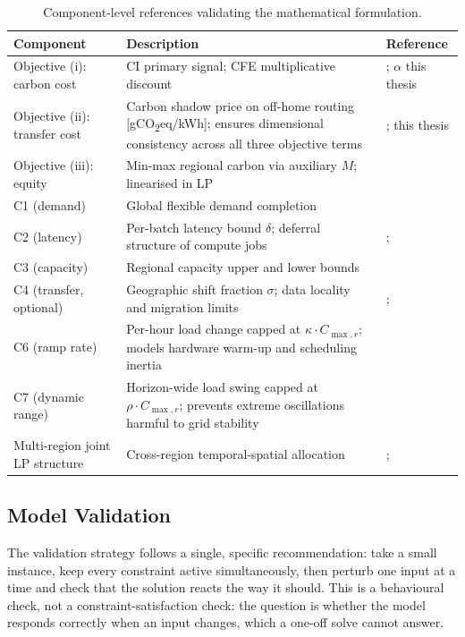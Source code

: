 \documentclass[11pt, a4paper]{article}
\begin{document}
\begin{table}[h]
\centering
\begin{tabularx}{\linewidth}{p{3.6cm}Xp{4cm}}
\toprule
\textbf{Component} & \textbf{Description} & \textbf{Reference} \\
\midrule
Objective (i): carbon cost
  & CI primary signal; CFE multiplicative discount
  & \citet{radovanovic2023}; $\alpha$ this thesis \\
Objective (ii): transfer cost
  & Carbon shadow price on off-home routing [gCO\textsubscript{2}eq/kWh]; ensures dimensional consistency across all three objective terms
  & \citet{attenni2024shifting}; this thesis \\
Objective (iii): equity
  & Min-max regional carbon via auxiliary $M$; linearised in LP
  & \citet{li2024equitable} \\
C1 (demand)
  & Global flexible demand completion
  & \citet{liu2012} \\
C2 (latency)
  & Per-batch latency bound $\delta$; deferral structure of compute jobs
  & \citet{liu2012}; \citet{attenni2024shifting} \\
C3 (capacity)
  & Regional capacity upper and lower bounds
  & \citet{liu2012} \\
C4 (transfer, optional)
  & Geographic shift fraction $\sigma$; data locality and migration limits
  & \citet{riepin2024spatiotemporal}; \citet{attenni2024shifting} \\
C6 (ramp rate)
  & Per-hour load change capped at $\kappa \cdot C_{\max,r}$; models hardware warm-up and scheduling inertia
  & \citet{wijayawardana2025scheduling} \\
C7 (dynamic range)
  & Horizon-wide load swing capped at $\rho \cdot C_{\max,r}$; prevents extreme oscillations harmful to grid stability
  & \citet{wijayawardana2025scheduling} \\
Multi-region joint LP structure
  & Cross-region temporal-spatial allocation
  & \citet{riepin2024spatiotemporal}; \citet{attenni2024shifting} \\
\bottomrule
\end{tabularx}
\caption{Component-level references validating the mathematical formulation.}
\end{table}

\subsection{Model Validation}
\label{sec:validation}

The validation strategy follows a single, specific recommendation: take a small instance, keep every constraint active simultaneously, then perturb one input at a time and check that the solution reacts the way it should. This is a behavioural check, not a constraint-satisfaction check: the question is whether the model responds correctly when an input changes, which a one-off solve cannot answer.
\end{document}
